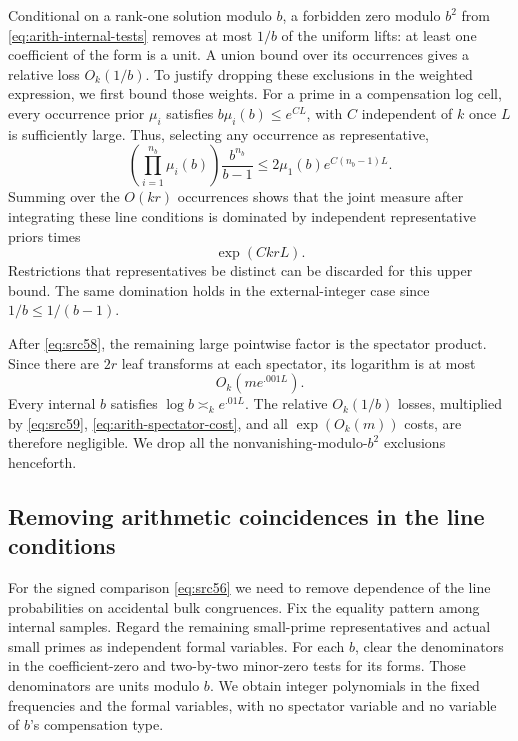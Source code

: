 Conditional on a rank-one solution modulo $b$, a forbidden zero modulo
$b^2$ from \eqref{eq:arith-internal-tests} removes at most $1/b$ of the
uniform lifts: at least one coefficient of the form is a unit. A union bound
over its occurrences gives a relative loss $O_k(1/b)$. To justify dropping
these exclusions in the weighted expression, we first bound those weights.
For a prime in a compensation log cell, every occurrence prior $\mu_i$
satisfies $b\mu_i(b)\leq e^{CL}$, with $C$ independent of $k$ once $L$
is sufficiently large. Thus, selecting any occurrence as representative,
\[
 \left(\prod_{i=1}^{n_b}\mu_i(b)\right)
       \frac{b^{n_b}}{b-1}
 \leq 2\mu_1(b)e^{C(n_b-1)L}.
\]
Summing over the $O(kr)$ occurrences shows that the joint measure after
integrating these line conditions is dominated by independent
representative priors times
\begin{equation}\label{eq:src59}
                              \exp(CkrL).
\end{equation}
Restrictions that representatives be distinct can be discarded for this
upper bound. The same domination holds in the external-integer case since
$1/b\leq1/(b-1)$.

After \eqref{eq:src58}, the remaining large pointwise factor is the
spectator product. Since there are $2r$ leaf transforms at each spectator,
its logarithm is at most
\begin{equation}\label{eq:arith-spectator-cost}
                              O_k(m e^{.001L}).
\end{equation}
Every internal $b$ satisfies $\log b\asymp_k e^{.01L}$. The relative
$O_k(1/b)$ losses, multiplied by \eqref{eq:src59},
\eqref{eq:arith-spectator-cost}, and all $\exp(O_k(m))$ costs, are therefore
negligible. We drop all the nonvanishing-modulo-$b^2$ exclusions henceforth.

\subsection{Removing arithmetic coincidences in the line conditions}

For the signed comparison \eqref{eq:src56} we need to remove dependence of
the line probabilities on accidental bulk congruences. Fix the equality
pattern among internal samples. Regard the remaining small-prime
representatives and actual small primes as independent formal variables.
For each $b$, clear the denominators in the coefficient-zero and
two-by-two minor-zero tests for its forms. Those denominators are units
modulo $b$. We obtain integer polynomials in the fixed frequencies and the
formal variables, with no spectator variable and no variable of $b$'s
compensation type.

